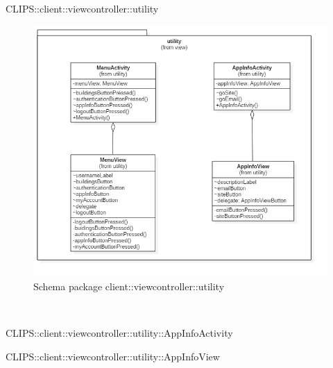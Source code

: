 \begin{componente}{CLIPS::client::viewcontroller::utility}
\begin{figure}[h!] 
\centering 
\includegraphics[scale=0.4]{img/package/png/client--viewcontroller--utility.png} 
\caption{Schema package client::viewcontroller::utility} 
 \end{figure} 
\begin{compClassi} \\ 
\begin{classe}{CLIPS::client::viewcontroller::utility::AppInfoActivity}
\begin{classeMetodi}
\begin{classeMetodoArgomenti}
\end{classeMetodoArgomenti}
\end{classeMetodi}
\begin{classeRelazioni}
\end{classeRelazioni}
\end{classe}\begin{classe}{CLIPS::client::viewcontroller::utility::AppInfoView}

\end{classe}
\end{compClassi}
\end{componente}
